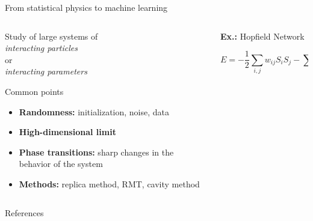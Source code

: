 \documentclass[10pt]{beamer}
\begin{document}
\begin{frame}{From statistical physics to machine learning}
  \begin{columns}
    \begin{column}{0.5\textwidth}
        \begin{center}
          Study of large systems of \\
          \emph{interacting particles}\\
            or\\
          \emph{interacting parameters}
        \end{center}
    
      \begin{block}{Common points}
        \begin{itemize}
          \item \textbf{Randomness:} initialization, noise, data
          \item \textbf{High-dimensional limit}
          \item \textbf{Phase transitions:} sharp changes in the behavior of the system
          \item \textbf{Methods:} replica method, RMT, cavity method
        \end{itemize}
      \end{block}
    \end{column}
    \begin{column}{0.5\textwidth}
      \textbf{Ex.:} Hopfield Network \cite{hopfield1982neural}
      \begin{center}
      \end{center}
      \begin{equation*}
        E = -\frac12\sum_{i,j} w_{ij} S_i S_j -\sum_i \theta_i S_i
      \end{equation*}
    \end{column}
  \end{columns}

\end{frame}

\appendix

\begin{frame}{References}

  
  

\end{frame}
\end{document}
